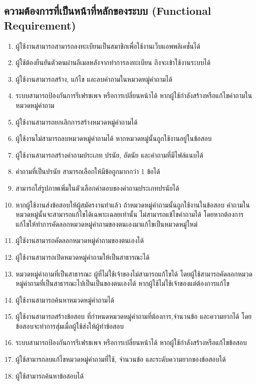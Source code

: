 \subsection{ความต้องการที่เป็นหน้าที่หลักของระบบ (Functional Requirement)}
\begin{enumerate}
  \item ผู้ใช้งานสามารถสามารถลงทะเบียนเป็นสมาชิกเพื่อใช้งานเว็บแอพพลิเคชั่นได้   
  \item ผู้ใช้ต้องยืนยันตัวตนผ่านอีเมลหลังจากทำการลงทะเบียน ถึงจะเข้าใช้งานระบบได้
  \item ผู้ใช้งานสามารถสร้าง, แก้ไข และลบคำถามในหมวดหมู่คำถามได้
  \item ระบบสามารถป้องกันการรีเฟรชเพจ หรือการเปลี่ยนหน้าได้ หากผู้ใช้กำลังสร้างหรือแก้ไขคำถามในหมวดหมู่คำถาม
  \item ผู้ใช้งานสามารถยกเลิกการสร้างหมวดหมู่คำถามได้
  \item ผู้ใช้งานไม่สามารถลบหมวดหมู่คำถามได้ หากหมวดหมู่นั้นถูกใช้งานอยู่ในข้อสอบ
  \item ผู้ใช้งานสามารถสร้างคำถามประเภท ปรนัย, อัตนัย และคำถามที่มีไฟล์แนบได้
  \item คำถามที่เป็นปรนัย สามารถเลือกให้มีข้อถูกมากกว่า 1 ข้อได้
  \item สามารถใส่รูปภาพเพิ่มในตัวเลือกคำตอบของคำถามประเภทปรนัยได้
  \item หากผู้ใช้งานส่งข้อสอบให้ผู้สมัครงานทำแล้ว ถ้าหมวดหมู่คำถามนั้นถูกใช้งานในข้อสอบ คำถามในหมวดหมู่นั้นจะสามารถแก้ไขได้เฉพาะเฉลยเท่านั้น ไม่สามารถแข้ไขคำถามได้ โดยหากต้องการแก้ไขให้ทำการคัดลอกหมวดหมู่คำถามของตนเองมาแก้ไขเป็นหมวดหมู่ใหม่
  \item ผู้ใช้งานสามารถคัดลอกหมวดหมู่คำถามของตนเองได้
  \item ผู้ใช้งานสามารถเปิดหมวดหมู่คำถามให้เป็นสาธารณะได้
  \item หมวดหมู่คำถามที่เป็นสาธารณะ ผู้ที่ไม่ใช้เจ้าของไม่สามารถแก้ไขได้ โดยผู้ใช้สามารถคัดลอกหมวดหมู่คำถามที่เป็นสาธารณะไปเป็นเป็นของตนเองได้ หากผู้ใช้ไม่ใช้เจ้าของแต่ต้องการแก้ไข
  \item ผู้ใช้งานสามารถค้นหาหมวดหมู่คำถามได้
  \item ผู้ใช้งานสามารถสร้างข้อสอบ ที่กำหนดหมวดหมู่คำถามที่ต้องการ,จำนวนข้อ และความยากได้ โดยข้อสอบจะทำการสุ่มเมื่อผู้ใช้ส่งให้ผู้ทำข้อสอบ
  \item ระบบสามารถป้องกันการรีเฟรชเพจ หรือการเปลี่ยนหน้าได้ หากผู้ใช้กำลังสร้างหรือแก้ไขข้อสอบ
  \item ผู้ใช้สามารถลบแก้ไขหมวดหมู่คำถามที่ใช้, จำนวนข้อ และระดับความยากของข้อสอบได้
  \item ผู้ใช้สามารถค้นหาข้อสอบได้

\end{enumerate}

